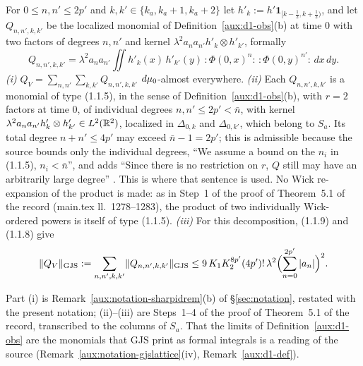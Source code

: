 \begin{auxlemma}\label{aux:d4-QV}
For $0\le n,n'\le2p'$ and $k,k'\in\{k_a,k_a+1,k_a+2\}$ let
$h'_k:=h'\mathbf 1_{[k-\frac12,k+\frac12)}$, and let $Q_{n,n',k,k'}$ be the localized monomial of
Definition~\ref{aux:d1-obs}(b) at time $0$ with two factors of degrees $n,n'$ and kernel
$\lambda^2a_na_{n'}h'_k\otimes h'_{k'}$, formally
\[
 Q_{n,n',k,k'}=\lambda^2a_na_{n'}\iint h'_k(x)\,h'_{k'}(y)\,{:}\Phi(0,x)^n{:}\,{:}\Phi(0,y)^{n'}{:}
 \,dx\,dy .
\]
\emph{(i)} $Q_V=\sum_{n,n'}\sum_{k,k'}Q_{n,n',k,k'}$ $d\mu_0$-almost everywhere.
\emph{(ii)} Each $Q_{n,n',k,k'}$ is a monomial of type (1.1.5), in the sense of
Definition~\ref{aux:d1-obs}(b), with $r=2$ factors at time $0$, of individual degrees
$n,n'\le2p'<\bar n$, with kernel $\lambda^2a_na_{n'}h'_k\otimes h'_{k'}\in L^2(\mathbb{R}^2)$, localized
in $\Delta_{0,k}$ and $\Delta_{0,k'}$, which belong to $S_a$.  Its total degree $n+n'\le4p'$ may
exceed $\bar n-1=2p'$; this is admissible because the source bounds only the individual degrees,
``We assume a bound on the $n_i$ in (1.1.5), $n_i<\bar n$'', and adds ``Since there is no
restriction on $r$, $Q$ still may have an arbitrarily large degree'' \cite[p.~593]{GJS}.  This is
where that sentence is used.  No Wick re-expansion of the product is made: as in Step~1 of the
proof of Theorem~5.1 of the record (main.tex ll.~1278--1283), the product of two individually
Wick-ordered powers is itself of type (1.1.5).
\emph{(iii)} For this decomposition, (1.1.9) and (1.1.8) give
\[
 \lVert Q_V\rVert_{\mathrm{GJS}}:=\sum_{n,n',k,k'}\lVert Q_{n,n',k,k'}\rVert_{\mathrm{GJS}}
 \le9\,K_1K_2^{8p'}(4p')!\,\lambda^2\Bigl(\sum_{n=0}^{2p'}|a_n|\Bigr)^2 .
\]
\end{auxlemma}

Part (i) is Remark~\ref{aux:notation-sharpidrem}(b) of \S\ref{sec:notation}, restated with the
present notation; (ii)--(iii) are Steps~1--4 of the proof of Theorem~5.1 of the record,
transcribed to the columns of $S_a$.  That the limits of Definition~\ref{aux:d1-obs} are the
monomials that GJS print as formal integrals is a reading of the source
(Remark~\ref{aux:notation-gjslattice}(iv), Remark~\ref{aux:d1-def}).

